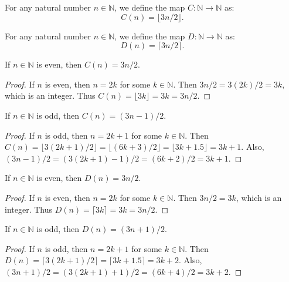 \begin{definition}
  \label{def:C}
  \leanok
  For any natural number $n \in \mathbb{N}$, we define the map $C: \mathbb{N} \to \mathbb{N}$ as:
  \[ C(n) = \lfloor 3n/2 \rfloor. \]
\end{definition}

\begin{definition}
  \label{def:D}
  \leanok
  For any natural number $n \in \mathbb{N}$, we define the map $D: \mathbb{N} \to \mathbb{N}$ as:
  \[ D(n) = \lceil 3n/2 \rceil. \]
\end{definition}

\begin{lemma}
  \label{lemma:C_even}
  \leanok
  If $n \in \mathbb{N}$ is even, then $C(n) = 3n/2$.
  \begin{proof}
    \leanok
    If $n$ is even, then $n = 2k$ for some $k \in \mathbb{N}$. Then $3n/2 = 3(2k)/2 = 3k$, which is an integer.
    Thus $C(n) = \lfloor 3k \rfloor = 3k = 3n/2$.
  \end{proof}
\end{lemma}

\begin{lemma}
  \label{lemma:C_odd}
  \leanok
  If $n \in \mathbb{N}$ is odd, then $C(n) = (3n-1)/2$.
  \begin{proof}
    \leanok
    If $n$ is odd, then $n = 2k+1$ for some $k \in \mathbb{N}$.
    Then $C(n) = \lfloor 3(2k+1)/2 \rfloor = \lfloor (6k+3)/2 \rfloor = \lfloor 3k + 1.5 \rfloor = 3k+1$.
    Also, $(3n-1)/2 = (3(2k+1)-1)/2 = (6k+2)/2 = 3k+1$.
  \end{proof}
\end{lemma}

\begin{lemma}
  \label{lemma:D_even}
  \leanok
  If $n \in \mathbb{N}$ is even, then $D(n) = 3n/2$.
  \begin{proof}
    \leanok
    If $n$ is even, then $n = 2k$ for some $k \in \mathbb{N}$. Then $3n/2 = 3k$, which is an integer.
    Thus $D(n) = \lceil 3k \rceil = 3k = 3n/2$.
  \end{proof}
\end{lemma}

\begin{lemma}
  \label{lemma:D_odd}
  \leanok
  If $n \in \mathbb{N}$ is odd, then $D(n) = (3n+1)/2$.
  \begin{proof}
    \leanok
    If $n$ is odd, then $n = 2k+1$ for some $k \in \mathbb{N}$.
    Then $D(n) = \lceil 3(2k+1)/2 \rceil = \lceil 3k + 1.5 \rceil = 3k+2$.
    Also, $(3n+1)/2 = (3(2k+1)+1)/2 = (6k+4)/2 = 3k+2$.
  \end{proof}
\end{lemma}

